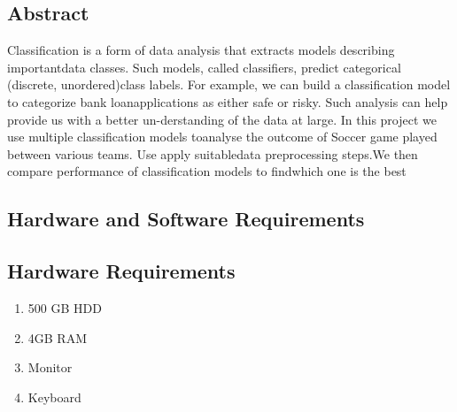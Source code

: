 \documentclass[a4paper, 12pt]{article}
\begin{document}
\newpage
\begin{center}
    \section{Abstract}
\end{center}
Classification is a form of data analysis that extracts models describing importantdata classes.  Such models, called classifiers, predict categorical (discrete, unordered)class labels.  For example, we can build a classification model to categorize bank loanapplications as either safe or risky. Such analysis can help provide us with a better un-derstanding of the data at large. In this project we use multiple classification models toanalyse the outcome of Soccer game played between various teams. Use apply suitabledata preprocessing steps.We then compare performance of classification models to findwhich one is the best
\newpage
\begin{center}
    \section{Hardware and Software Requirements}
\end{center}
\subsection{Hardware Requirements}
\begin{enumerate}
    \item 500 GB HDD
    \item 4GB RAM
    \item Monitor
    \item Keyboard
\end{enumerate}
\end{document}
